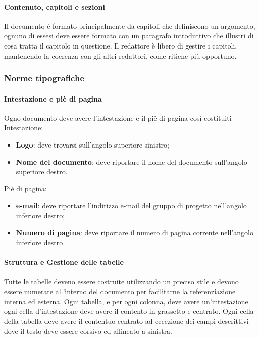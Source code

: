   \paragraph{Contenuto, capitoli e sezioni}
  Il documento è formato principalmente da capitoli che definiscono un argomento,
  ognuno di essesi deve essere formato con un paragrafo introduttivo che illustri
  di cosa tratta il capitolo in questione.
  Il redattore è libero di gestire i capitoli, mantenendo la coerenza con gli altri
  redattori, come ritiene più opportuno.
  \subsubsection{Norme tipografiche}
  \paragraph{Intestazione e piè di pagina}
  Ogno documento deve avere l'intestazione e il piè di pagina così costituiti
  Intestazione:
  \begin{itemize}
    \item \textbf{Logo}: deve trovarsi sull'angolo superiore sinistro;
    \item \textbf{Nome del documento}: deve riportare il nome del documento sull'angolo superiore destro.
  \end{itemize}
  Piè di pagina:
  \begin{itemize}
    \item \textbf{e-mail}: deve riportare l'indirizzo e-mail del gruppo di progetto
    nell'angolo inferiore destro;
    \item \textbf{Numero di pagina}: deve riportare il numero di pagina corrente
     nell'angolo inferiore destro
  \end{itemize}

  \paragraph{Struttura e Gestione delle tabelle}
  Tutte le tabelle deveno essere costruite utilizzando un preciso stile e devono
  essere numerate all'interno del documento per facilitarne la referenziazione
  interna ed esterna.
  Ogni tabella, e per ogni colonna, deve avere un'intestazione ogni cella d'intestazione
  deve avere il contento in grassetto e centrato.
  Ogni cella della tabella deve avere il contentuo centrato ad eccezione dei campi
  descrittivi dove il testo deve essere corsivo ed allineato a sinistra.
